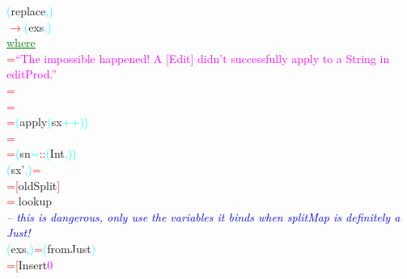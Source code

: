 \textcolor{cyan}{(}{\rm{}replace}\textcolor{cyan}{,}\textcolor{cyan}{)}\\\hsspace \textcolor{red}{\ensuremath{\rightarrow}}\hsspace \textcolor{cyan}{(}{\rm{}exs}\textcolor{cyan}{,}\textcolor{cyan}{)}\\\hstab \textcolor{green}{\underline{where}}\\\hsspace \textcolor{red}{=}\hsspace \textcolor{magenta}{``The impossible happened! A [Edit] didn't successfully apply to a String in editProd.''}\\\hsspace \hsspace \textcolor{red}{=}\\\hsspace \hsspace \textcolor{red}{=}\\\hsspace \hsspace \textcolor{red}{=}\hsspace \textcolor{cyan}{(}{\rm{}apply}\hsspace \textcolor{cyan}{(}{\rm{}sx}\hsspace \textcolor{cyan}{++}\textcolor{cyan}{)}\textcolor{cyan}{)}\\\hsspace \hsspace \hsspace \hsspace \hsspace \textcolor{red}{=}\\\hsspace \hsspace \hsspace \hsspace \hsspace \textcolor{red}{=}\hsspace \textcolor{cyan}{(}{\rm{}sn}\hsspace \textcolor{cyan}{=\tilde{ }}\hsspace \textcolor{red}{::}\hsspace \textcolor{cyan}{(}{\rm{}Int}\textcolor{cyan}{,}\textcolor{cyan}{)}\textcolor{cyan}{)}\\\hstab \textcolor{cyan}{(}{\rm{}sx'}\textcolor{cyan}{,}\textcolor{cyan}{)}\hsspace \hsspace \hsspace \textcolor{red}{=}\\\hsspace \hsspace \hsspace \textcolor{red}{=}\hsspace \textcolor{red}{[}{\rm{}oldSplit}\textcolor{red}{]}\\\hsspace \hsspace \hsspace \hsspace \hsspace \textcolor{red}{=}\textcolor{cyan}{.}{\rm{}lookup}\\\hstab \textcolor{blue}{{\it{}-- this is dangerous, only use the variables it binds when splitMap is definitely a Just!}}\\\hstab \textcolor{cyan}{(}{\rm{}exs}\textcolor{cyan}{,}\textcolor{cyan}{)}\hsspace \hsspace \hsspace \textcolor{red}{=}\hsspace \textcolor{cyan}{(}{\rm{}fromJust}\textcolor{cyan}{)}\\\hsspace \textcolor{red}{=}\hsspace \textcolor{red}{[}{\rm{}Insert}\hsspace \textcolor{magenta}{0}\hsspace 